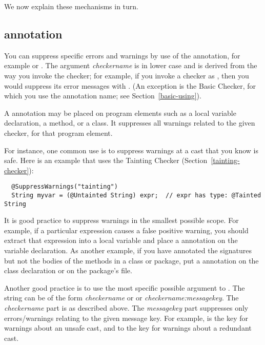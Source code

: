 \noindent
We now explain these mechanisms in turn.


\subsection{ annotation\label{suppresswarnings-annotation}}

You can suppress specific errors and warnings by use of the
 annotation, for example
 or .
The argument \emph{checkername} is in lower case and is derived from the
way you invoke the checker; for example, if you invoke a checker as
, then you would suppress its
error messages with .  (An exception is
the Basic Checker, for which you use the annotation name; see
Section~\ref{basic-using}).

A 
annotation may be placed on program elements such as a local
variable declaration, a method, or a class.  It suppresses all warnings
related to the given checker, for that program element.

For instance, one common use is
to suppress warnings at a cast that you know is safe.  Here is an example
that uses the Tainting Checker (Section~\ref{tainting-checker}):

\begin{Verbatim}
  @SuppressWarnings("tainting")
  String myvar = (@Untainted String) expr;  // expr has type: @Tainted String
\end{Verbatim}

It is good practice to suppress warnings in the
smallest possible scope.  For example, if a particular expression causes a
false positive warning, you should extract that expression into a local variable
and place a  annotation on the variable
declaration.
As another example, if you have annotated the signatures but not the bodies
of the methods in a class or package, put a 
annotation on the class declaration or on the package's
 file.

\label{compiler-message-keys}

Another good practice is to use the most specific possible argument to
.  The string can be of the form \emph{checkername} or
or \emph{checkername:messagekey}.  The \emph{checkername} part is as
described above.  The \emph{messagekey} part suppresses only
errors/warnings relating to the given message key.  For example,
 is the key for warnings about an unsafe cast, and
 to the key for warnings about a redundant cast.


